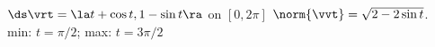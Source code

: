 {$\ds \vrt = \la t+\cos t,1-\sin t \ra$ on $[0,2\pi]$
}
{
$\norm{\vvt} = \sqrt{2-2\sin t}$. \\
min: $t=\pi/2$; max: $t=3\pi/2$
}